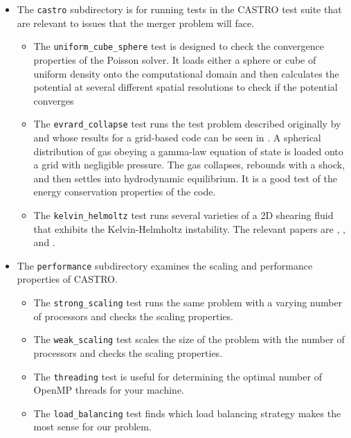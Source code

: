 \documentclass[12pt]{book}
\begin{document}
\begin{itemize}
  \item The \texttt{castro} subdirectory is for running tests in the CASTRO test suite that are relevant
  to issues that the merger problem will face.
  \begin{itemize}
    \item The \texttt{uniform\_cube\_sphere} test is designed to check the convergence
        properties of the Poisson solver. It loads either a sphere or cube of uniform density
        onto the computational domain and then calculates the potential at several different
        spatial resolutions to check if the potential converges
    \item The \texttt{evrard\_collapse} test runs the test problem described originally by 
      \cite{evrard:1988} and whose results for a grid-based code can be seen in \cite{arepo}. A spherical
      distribution of gas obeying a gamma-law equation of state is loaded onto a grid with negligible 
      pressure. The gas collapses, rebounds with a shock, and then settles into hydrodynamic equilibrium.
      It is a good test of the energy conservation properties of the code.
    \item The \texttt{kelvin\_helmoltz} test runs several varieties of a 2D shearing fluid that exhibits the 
      Kelvin-Helmholtz instability. The relevant papers are \cite{robertson:2010}, \cite{arepo}, and \cite{mcnally:2012}.
  \end{itemize}

  \item The \texttt{performance} subdirectory examines the scaling and performance properties of CASTRO.
  \begin{itemize}
    \item The \texttt{strong\_scaling} test runs the same problem with a varying number of processors and 
      checks the scaling properties.
    \item The \texttt{weak\_scaling} test scales the size of the problem with the number of processors and
      checks the scaling properties.
    \item The \texttt{threading} test is useful for determining the optimal number of OpenMP threads for your machine.
    \item The \texttt{load\_balancing} test finds which load balancing strategy makes the most sense for our problem.
  \end{itemize}
\end{itemize}
\end{document}
